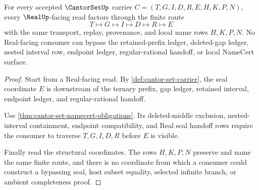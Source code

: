 \begin{theorem}
\label{thm:cantor-set-real-seal-nonescape}
For every accepted $\CantorSetUp$ carrier $C=(T,G,I,D,R,E,H,K,P,N)$, every $\RealUp$-facing read factors through the finite route
$$
T \longmapsto G \longmapsto I \longmapsto D \longmapsto R \longmapsto E
$$
with the same transport, replay, provenance, and local name rows $H,K,P,N$. No Real-facing consumer can bypass the retained-prefix ledger, deleted-gap ledger, nested interval row, endpoint ledger, regular-rational handoff, or local NameCert surface.
\end{theorem}
\begin{proof}
Start from a Real-facing read. By \autoref{def:cantor-set-carrier}, the seal coordinate $E$ is downstream of the ternary prefix, gap ledger, retained interval, endpoint ledger, and regular-rational handoff.

Use \autoref{thm:cantor-set-namecert-obligations}. Its deleted-middle exclusion, nested-interval containment, endpoint compatibility, and Real seal handoff rows require the consumer to traverse $T,G,I,D,R$ before $E$ is visible.

Finally read the structural coordinates. The rows $H,K,P,N$ preserve and name the same finite route, and there is no coordinate from which a consumer could construct a bypassing seal, host subset equality, selected infinite branch, or ambient completeness proof.
\end{proof}

